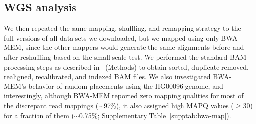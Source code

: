 \documentclass[10pt,a4paper]{article}
\begin{document}
\subsection*{WGS analysis}
We then repeated the same mapping, shuffling, and remapping strategy to the full versions of all data sets we downloaded, but we mapped using only BWA-MEM, since the other mappers 
would generate the same alignments before and after reshuffling based on the small scale test. We performed the standard BAM processing steps as described 
in~\cite{VanderAuwera2013} (Methods) to obtain sorted, duplicate-removed, realigned, recalibrated, and indexed BAM files. We also investigated BWA-MEM's behavior of random placements using the
HG00096 genome, and interestingly, although BWA-MEM reported zero mapping qualities for 
most of the discrepant read mappings ($\sim$97\%), it also assigned high MAPQ values ($\geq$30) for a fraction of them  ($\sim$0.75\%; Supplementary Table~\ref{supptab:bwa-map}). 


\end{document}
